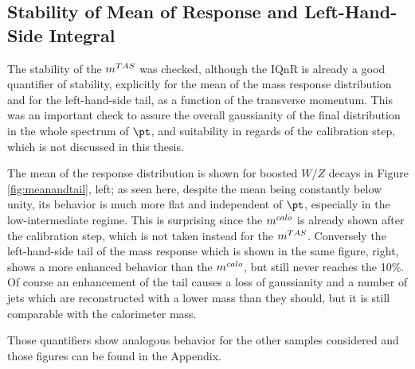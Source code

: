 \subsection{Stability of Mean of Response and Left-Hand-Side Integral }
The stability of the $m^{TAS}$ was checked, although the IQnR is already a good quantifier of stability, explicitly for the mean of the mass response distribution and for the left-hand-side tail, as a function of the transverse momentum. This was an important check to assure the overall gaussianity of the final distribution in the whole spectrum of $\pt$, and suitability in regards of the calibration step, which is not discussed in this thesis.

The mean of the response distribution is shown for boosted $W/Z$ decays in Figure \ref{fig:meanandtail}, left; as seen here, despite the mean being constantly below unity, its behavior is much more flat and independent of $\pt$, especially in the low-intermediate regime. This is surprising since the $m^{calo}$ is already shown after the calibration step, which is not taken instead for the $m^{TAS}$. Conversely the left-hand-side tail of the mass response which is shown in the same figure, right, shows a more enhanced behavior than the $m^{calo}$, but still never reaches the 10\%. Of course an enhancement of the tail causes a loss of gaussianity and a number of jets which are reconstructed with a lower mass than they should, but it is still comparable with the calorimeter mass.

Those quantifiers show analogous behavior for the other samples considered and those figures can be found in the Appendix.

